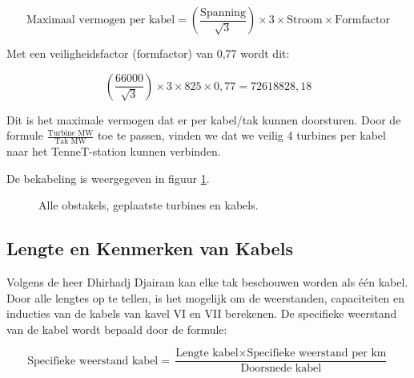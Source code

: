 \begin{equation} \label{eq:26}
\text{{Maximaal vermogen per kabel}} = \left(\frac{{\text{{Spanning}}}}{{\sqrt{3}}}\right) \times 3 \times \text{{Stroom}} \times \text{{Formfactor}}
\end{equation} 

Met een veiligheidsfactor (formfactor) van 0,77 wordt dit:

\begin{equation} \label{eq:27}
\left(\frac{{66000}}{{\sqrt{3}}}\right) \times 3 \times 825 \times 0,77 = 72618828,18
\end{equation} 

Dit is het maximale vermogen dat er per kabel/tak kunnen doorsturen. Door de formule \(\frac{{\text{{Turbine MW}}}}{{\text{{Tak MW}}}}\) toe te passen, vinden we dat we veilig 4 turbines per kabel naar het TenneT-station kunnen verbinden.

De bekabeling is weergegeven in figuur \ref{fig:windparktotaal}.

\begin{figure}[H]
    \centering
    \setlength{\fboxsep}{0pt}  %
    \colorbox{darkgray}{}
    \caption{Alle obstakels, geplaatste turbines en kabels.}
    \label{fig:windparktotaal}
\end{figure}

\subsection{Lengte en Kenmerken van Kabels}
Volgens de heer Dhirhadj Djairam kan elke tak beschouwen worden als één kabel. Door alle lengtes op te tellen, is het mogelijk om de weerstanden, capaciteiten en inducties van de kabels van kavel VI en VII berekenen. De specifieke weerstand van de kabel wordt bepaald door de formule:

\begin{equation} \label{eq:28}
\text{{Specifieke weerstand kabel}} = \frac{{\text{{Lengte kabel}} \times \text{{Specifieke weerstand per km}}}}{{\text{{Doorsnede kabel}}}}
\end{equation} 

